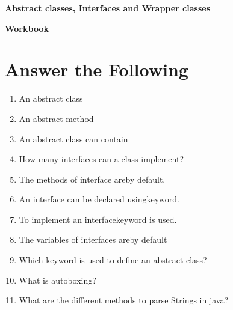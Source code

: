 \documentclass[11pt,a4paper]{article}
\def\AnswerBox{\fbox{\begin{minipage}{4in}\hfill\vspace{0.5in}\end{minipage}}}
\begin{document}
\centerline{\huge{ \textbf{Abstract classes, Interfaces and Wrapper classes}}}

\vspace{1pc}

\centerline{\huge{ \textbf{ Workbook}}}

\section*{Answer the Following}
\begin{enumerate}\itemsep10pt

\item An abstract class\underline{\hspace{3cm}}
\item An abstract method\underline{\hspace{3cm}}
\item An abstract class can contain\underline{\hspace{3cm}}
\item How many interfaces can a class implement?\underline{\hspace{3cm}}
\item The methods of interface are\underline{\hspace{3cm}}by default.
\item An interface can be declared using\underline{\hspace{3cm}}keyword.
\item To implement an interface\underline{\hspace{3cm}}keyword is used.
\item The variables of interfaces are\underline{\hspace{3cm}}by default
\item Which keyword is used to define an abstract class?\underline{\hspace{3cm}}
\item What is autoboxing?

\AnswerBox

\item What are the different methods to parse Strings in java? \underline{\hspace{4cm}}
\end{enumerate}
\end{document}
